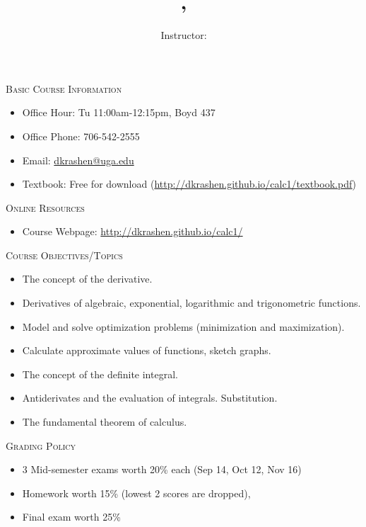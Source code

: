 \documentclass[12pt]{amsart}
\title{\course, \semester}
\author{Instructor: \instructor}
\makeatletter
\newcommand{\officehour}{Office Hour: Tu 11:00am-12:15pm, Boyd 437}
\newcommand{\phone}{706-542-2555}
\newcommand{\emailaddr}{dkrashen@uga.edu}
\newcommand{\textbook}{{Free for download }
(\url{http://dkrashen.github.io/calc1/textbook.pdf})}
\newcommand{\website}{http://dkrashen.github.io/calc1/}
\makeatother
\begin{document}
\maketitle


\thispagestyle{empty}
\noindent
\textsc{Basic Course Information}

\begin{itemize}
\item 
\officehour
\item
Office Phone: \phone
\item
Email: \url{\emailaddr}
\item
Textbook: \textbook
\end{itemize}

\medskip

\noindent
\textsc{Online Resources}

\begin{itemize}
\item
Course Webpage:  
\url{\website} 
\end{itemize}

\medskip

\noindent
\textsc{Course Objectives/Topics}

\begin{itemize}
\item
The concept of the derivative.
\item
Derivatives of algebraic, exponential, logarithmic and trigonometric
functions.
\item
Model and solve optimization problems (minimization and
maximization).
\item
Calculate approximate values of functions, sketch graphs.
\item
The concept of the definite integral.
\item
Antiderivates and the evaluation of integrals. Substitution. 
\item
The fundamental theorem of calculus.
\end{itemize}

\medskip

\noindent
\textsc{Grading Policy}

\begin{itemize}
\item
3 Mid-semester exams worth 20\% each (Sep 14, Oct 12, Nov 16)
\item
Homework worth 15\% (lowest 2 scores are dropped), 
\item
Final exam worth 25\% 
\end{itemize}
\end{document}
